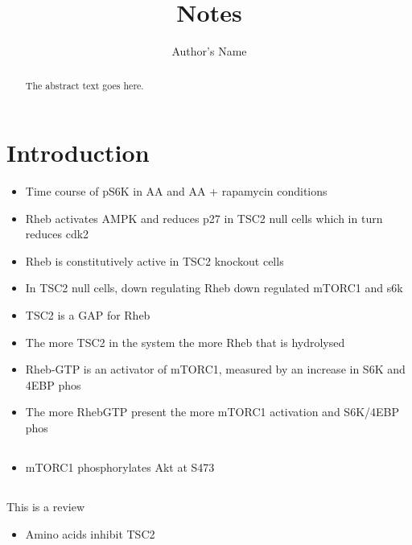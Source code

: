 \documentclass{article}
\begin{document}
    \title{Notes}
    \author{Author's Name}

    \maketitle

    \begin{abstract}
        The abstract text goes here.
    \end{abstract}

    \section{Introduction}

    \begin{itemize}
        \item Time course of pS6K in AA and AA + rapamycin conditions \cite{patursky-polischuk2014}
        \item Rheb activates AMPK and reduces p27 in TSC2 null cells which in turn reduces cdk2 \cite{lacher2010rheb}
        \item Rheb is constitutively active in TSC2 knockout cells \cite{lacher2010rheb}
        \item In TSC2 null cells, down regulating Rheb down regulated mTORC1 and s6k
        \item TSC2 is a GAP for Rheb~\cite{inoki2003}
        \item The more TSC2 in the system the more Rheb that is hydrolysed \cite{inoki2003}
        \item Rheb-GTP is an activator of mTORC1, measured by an increase in S6K and 4EBP phos
        \item The more RhebGTP present the more mTORC1 activation and S6K/4EBP phos \cite{inoki2003}
    \end{itemize}

    \subsection{\cite{Sarbassov2005phosphorylation}}
    \begin{itemize}
        \item mTORC1 phosphorylates Akt at S473
    \end{itemize}


    \subsection{\cite{Sarbassov2005phosphorylation}}
    This is a review
    \begin{itemize}
        \item Amino acids inhibit TSC2
    \end{itemize}
\end{document}
